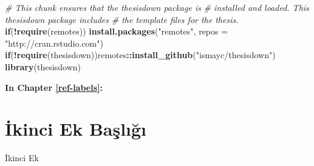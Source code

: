 \documentclass[12pt,twoside]{deuthesis}
\newenvironment{Shaded}{\begin{snugshade}}{\end{snugshade}}
\newcommand{\AttributeTok}[1]{\textcolor[rgb]{0.13,0.29,0.53}{#1}}
\newcommand{\CommentTok}[1]{\textcolor[rgb]{0.56,0.35,0.01}{\textit{#1}}}
\newcommand{\ControlFlowTok}[1]{\textcolor[rgb]{0.13,0.29,0.53}{\textbf{#1}}}
\newcommand{\FunctionTok}[1]{\textcolor[rgb]{0.13,0.29,0.53}{\textbf{#1}}}
\newcommand{\NormalTok}[1]{#1}
\newcommand{\SpecialCharTok}[1]{\textcolor[rgb]{0.81,0.36,0.00}{\textbf{#1}}}
\newcommand{\StringTok}[1]{\textcolor[rgb]{0.31,0.60,0.02}{#1}}
\begin{document}
\begin{Shaded}
\begin{Highlighting}[]
\CommentTok{\# This chunk ensures that the thesisdown package is}
\CommentTok{\# installed and loaded. This thesisdown package includes}
\CommentTok{\# the template files for the thesis.}
\ControlFlowTok{if}\NormalTok{(}\SpecialCharTok{!}\FunctionTok{require}\NormalTok{(remotes)) }\FunctionTok{install.packages}\NormalTok{(}\StringTok{"remotes"}\NormalTok{, }\AttributeTok{repos =} \StringTok{"http://cran.rstudio.com"}\NormalTok{)}
\ControlFlowTok{if}\NormalTok{(}\SpecialCharTok{!}\FunctionTok{require}\NormalTok{(thesisdown))remotes}\SpecialCharTok{::}\FunctionTok{install\_github}\NormalTok{(}\StringTok{"ismayc/thesisdown"}\NormalTok{)}
\FunctionTok{library}\NormalTok{(thesisdown)}
\end{Highlighting}
\end{Shaded}

\textbf{In Chapter \ref{ref-labels}:}

\hypertarget{ikinci-ek-baux15flux131ux11fux131}{%
\chapter{İkinci Ek Başlığı}\label{ikinci-ek-baux15flux131ux11fux131}}

İkinci Ek
\end{document}
